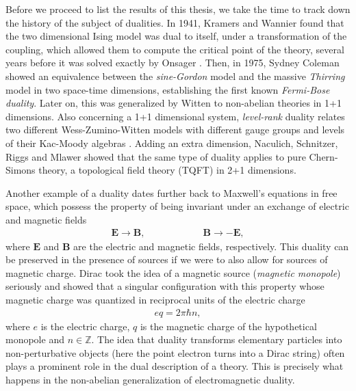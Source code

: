 Before we proceed to list the results of this thesis, we take the time to track down the history of the subject of dualities. In 1941, Kramers and Wannier \cite{Kramers:1941kn} found that the two dimensional Ising model was dual to itself, under a transformation of the coupling, which allowed them to compute the critical point of the theory, several years before it was solved exactly by Onsager \cite{Onsager:1943jn}.  Then, in 1975, Sydney Coleman \cite{Coleman:1974bu} showed an equivalence between the \textit{sine-Gordon} model \cite{Scott1973} and the massive \textit{Thirring} model \cite{Thirring1958} in two space-time dimensions, establishing the first known \textit{Fermi-Bose duality}. Later on, this was generalized by Witten \cite{Witten:1983ar} to non-abelian theories in 1+1 dimensions. Also concerning a 1+1 dimensional system, \textit{level-rank} duality relates two different Wess-Zumino-Witten models with different gauge groups and levels of their Kac-Moody algebras \cite{Nakanishi:1990hj, Naculich:1990hg}. Adding an extra dimension, Naculich, Schnitzer, Riggs and Mlawer \cite{Mlawer:1990uv, Naculich:2007nc} showed that the same type of duality applies to pure Chern-Simons theory, a topological field theory (TQFT) in 2+1 dimensions. 

Another example of a duality dates further back to Maxwell's equations in free space, which possess the property of being invariant under an exchange of electric and magnetic fields
\begin{align}
\bm{E}\rightarrow \bm{B}, \qquad\qquad\qquad \bm{B}\rightarrow -\bm{E},
\end{align}
where $\bm{E}$ and $\bm{B}$ are the electric and magnetic fields, respectively. This duality can be preserved in the presence of sources if we were to also allow for sources of magnetic charge. Dirac \cite{Dirac:1931kp} took the idea of a magnetic source (\textit{magnetic monopole}) seriously and showed that a singular configuration with this property whose magnetic charge was quantized in reciprocal units of the electric charge
\begin{align}
eq = 2\pi \hbar n,
\end{align}
where $e$ is the electric charge, $q$ is the magnetic charge of the hypothetical monopole and $n \in \mathbb{Z}$. The idea that duality transforms elementary particles into non-perturbative objects (here the point electron turns into a Dirac string) often plays a prominent role in the dual description of a theory. This is precisely what happens in the non-abelian generalization of electromagnetic duality.


